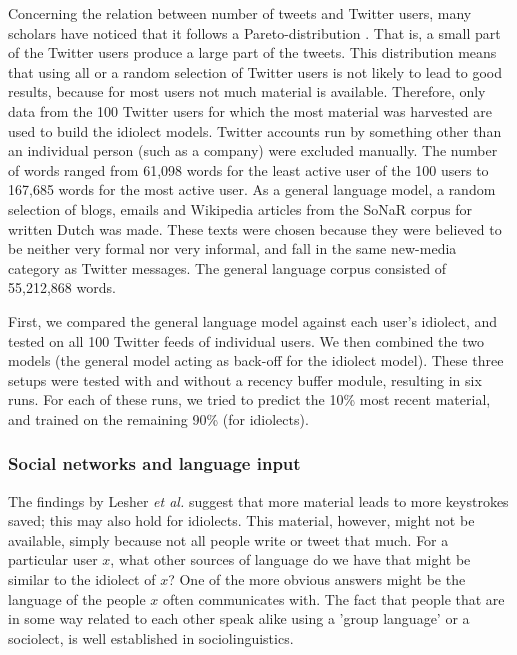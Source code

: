 \documentclass[12pt]{article}
\begin{document}
Concerning the relation between number of tweets and Twitter users, many scholars have noticed that it follows a Pareto-distribution \cite{heil+09,asur+10,rui+12}. That is, a small part of the Twitter users produce a large part of the tweets. 
This distribution means that using all or a random selection of Twitter users is not likely to lead to good results, because for most users not much material is available. Therefore, only data from the 100 Twitter users for which the most material was harvested are used to build the idiolect models. Twitter accounts run by something other than an individual person (such as a company) were excluded manually. The number of words ranged from 61,098 words for the least active user of the 100 users to 167,685 words for the most active user. As a general language model, a random selection of blogs, emails and Wikipedia articles from the SoNaR corpus for written Dutch \cite{oostdijk+13} was made. These texts were chosen because they were believed to be neither very formal nor very informal, and fall in the same new-media category as Twitter messages. The general language corpus consisted of 55,212,868 words.

First, we compared the general language model against each user's idiolect, and tested on all 100 Twitter feeds of individual users. We then combined the two models (the general model acting as back-off for the idiolect model). These three setups were tested with and without a recency buffer module, resulting in six runs. For each of these runs, we tried to predict the 10\% most recent material, and trained on the remaining 90\% (for idiolects).

\subsubsection{Social networks and language input} \label{input_networks}

The findings by Lesher {\em et al.} \citeyear{Lesher+99} suggest that more material leads to more keystrokes saved; this may also hold for idiolects. This material, however, might not be available, simply because not all people write or tweet that much. For a particular user $x$, what other sources of language do we have that might be similar to the idiolect of $x$? One of the more obvious answers might be the language of the people $x$ often communicates with. The fact that people that are in some way related to each other speak alike using a 'group language' or a sociolect, is well established in sociolinguistics.
\end{document}
